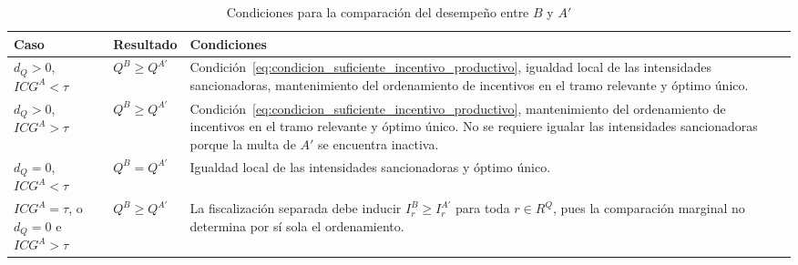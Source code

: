 \begin{table}[t]
\centering
\caption{Condiciones para la comparación del desempeño entre \(B\) y \(A'\)}
\label{tab:sintesis_desempeno_esquemas}
\small
\renewcommand{\arraystretch}{1.25}
\setlength{\tabcolsep}{6pt}

\begin{tabular}{
@{}
>{\centering\arraybackslash}p{}
>{\centering\arraybackslash}p{}
>{\raggedright\arraybackslash}p{}
@{}}
\toprule
\textbf{Caso}
&
\textbf{Resultado}
&
\textbf{Condiciones}
\\
\hline

\(d_Q>0\),
\(ICG^A<\tau\)
&
\(Q^B\geq Q^{A'}\)
&
Condición~\eqref{eq:condicion_suficiente_incentivo_productivo}, igualdad local de las intensidades sancionadoras, mantenimiento del ordenamiento de incentivos en el tramo relevante y óptimo único.
\\[5pt]

\(d_Q>0\),
\(ICG^A>\tau\)
&
\(Q^B\geq Q^{A'}\)
&
Condición~\eqref{eq:condicion_suficiente_incentivo_productivo}, mantenimiento del ordenamiento de incentivos en el tramo relevante y óptimo único. No se requiere igualar las intensidades sancionadoras porque la multa de \(A'\) se encuentra inactiva.
\\[5pt]

\(d_Q=0\),
\(ICG^A<\tau\)
&
\(Q^B=Q^{A'}\)
&
Igualdad local de las intensidades sancionadoras y óptimo único.
\\[5pt]

\(ICG^A=\tau\), o
\(d_Q=0\) e \(ICG^A>\tau\)
&
\(Q^B\geq Q^{A'}\)
&
La fiscalización separada debe inducir \(I_r^B\geq I_r^{A'}\) para toda \(r\in R^{Q}\), pues la comparación marginal no determina por sí sola el ordenamiento.
\\
\hline
\end{tabular}
\end{table}